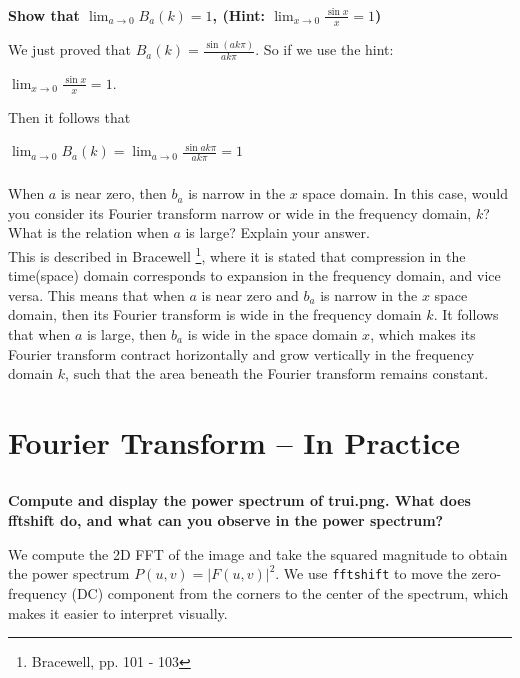 \documentclass[12pt]{article} %
\begin{document}
\subsubsection{}
\textbf{Show that $\lim_{a \rightarrow 0} B_a (k) = 1$, (Hint: $\lim_{x\rightarrow 0} \frac{\sin x }{x} = 1$)}

We just proved that $B_a(k)=\frac{\sin( a k \pi )}{a k \pi}$. So if we use the hint:

$\lim_{x\rightarrow 0} \frac{\sin x }{x} = 1$.

Then it follows that

$\lim_{a\rightarrow 0} B_a(k) =\lim_{a\rightarrow 0} \frac{\sin  a k \pi }{ a k \pi} = 1$


\subsubsection{}
When $a$ is near zero, then $b_a$ is narrow in the $x$ space domain. In
this case, would you consider its Fourier transform narrow or wide in the
frequency domain, $k$? What is the relation when $a$ is large? Explain your
answer.\\

This is described in Bracewell \footnote{Bracewell, pp. 101 - 103}, where it is stated that compression in the time(space) domain corresponds to expansion in the frequency domain, and vice versa. This means that when $a$ is near zero and $b_a$ is narrow in the $x$ space domain, then its Fourier transform is wide in the frequency domain $k$. It follows that when $a$ is large, then $b_a$ is wide in the space domain $x$, which makes its Fourier transform contract horizontally and grow vertically in the frequency domain $k$, such that the area beneath the Fourier transform remains constant.

\pagebreak

\section{Fourier Transform -- In Practice}

\subsection{}
\textbf{Compute and display the power spectrum of trui.png. What does fftshift do, and what can you observe in the power spectrum?}

We compute the 2D FFT of the image and take the squared magnitude to obtain the power spectrum $P(u,v) = |F(u,v)|^2$. We use \texttt{fftshift} to move the zero-frequency (DC) component from the corners to the center of the spectrum, which makes it easier to interpret visually.
\end{document}
